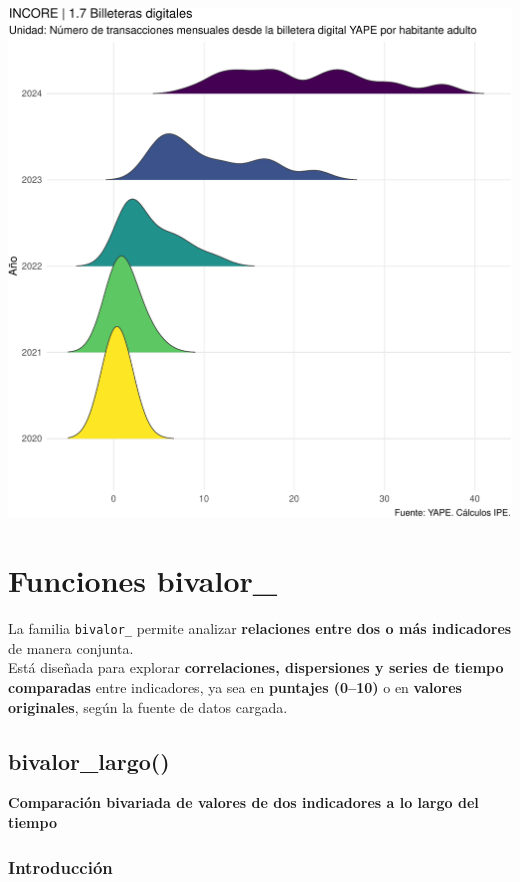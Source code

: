 \documentclass[
  11pt,
  letterpaper,
  DIV=11,
  numbers=noendperiod]{scrartcl}
\begin{document}
\includegraphics{Manual_files/figure-pdf/unnamed-chunk-105-1.pdf}

\section{Funciones bivalor\_}\label{funciones-bivalor_}

La familia \texttt{bivalor\_} permite analizar \textbf{relaciones entre
dos o más indicadores} de manera conjunta.\\
Está diseñada para explorar \textbf{correlaciones, dispersiones y series
de tiempo comparadas} entre indicadores, ya sea en \textbf{puntajes
(0--10)} o en \textbf{valores originales}, según la fuente de datos
cargada.

\subsection{\texorpdfstring{\textbf{bivalor\_largo()}}{bivalor\_largo()}}\label{bivalor_largo}

\textbf{Comparación bivariada de valores de dos indicadores a lo largo
del tiempo}

\subsubsection{\texorpdfstring{\textbf{Introducción}}{Introducción}}\label{introducciuxf3n-10}
\end{document}
